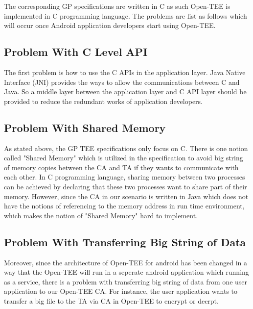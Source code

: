 \documentclass{cseminar}
\begin{document}
The corresponding GP specifications are written in C as such Open-TEE is implemented in C programming language. The problems are list as follows which will occur once Android application developers start using Open-TEE.

\subsection{Problem With C Level API}
The first problem is how to use the C APIs in the application layer. Java Native Interface (JNI) provides the ways to allow the communications between C and Java. So a middle layer between the application layer and C API layer should be provided to reduce the redundant works of application developers.

\subsection{Problem With Shared Memory}
As stated above, the GP TEE specifications only focus on C. There is one notion called "Shared Memory" which is utilized in the specification to avoid big string of memory copies between the CA and TA if they wants to communicate with each other. In C programming language, sharing memory between two processes can be achieved by declaring that these two processes want to share part of their memory. However, since the CA in our scenario is written in Java which does not have the notions of referencing to the memory address in run time environment, which makes the notion of "Shared Memory" hard to implement.

\subsection{Problem With Transferring Big String of Data}
Moreover, since the architecture of Open-TEE for android has been changed in a way that the Open-TEE will run in a seperate android application which running as a service, there is a problem with transferring big string of data from one user application to our Open-TEE CA. For instance, the user application wants to transfer a big file to the TA via CA in Open-TEE to encrypt or decrpt.

\iffalse
\begin{figure}[t]
  \begin{center}
    \texttt{[image: figures/draft.JPG]}
    \caption{Draft for reminder}
    \label{fig:architec}
  \end{center}
\end{figure}
\fi
\end{document}
